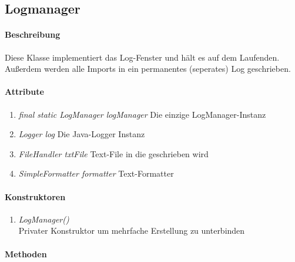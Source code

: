\subsection{Logmanager}

\paragraph{Beschreibung}
Diese Klasse implementiert das Log-Fenster und hält es auf dem Laufenden.
Außerdem werden alle Imports in ein permanentes (seperates) Log geschrieben.

\paragraph{Attribute}
\begin{enumerate}[$\bullet$]
	\item \textit{final static LogManager logManager}  Die einzige LogManager-Instanz
	\item \textit{Logger log} Die Java-Logger Instanz
	\item \textit{FileHandler txtFile} Text-File in die geschrieben wird
	\item \textit{SimpleFormatter formatter} Text-Formatter
\end{enumerate}

\paragraph{Konstruktoren}
\begin{enumerate}[-]
	\item \textit{LogManager()} \\
	Privater Konstruktor um mehrfache Erstellung zu unterbinden
\end{enumerate}


\paragraph{Methoden}

